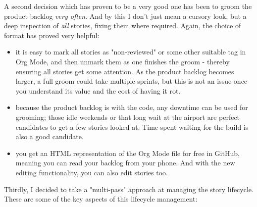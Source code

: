 \documentclass{book}
\begin{document}
A second decision which has proven to be a very good one has been to
groom the product backlog \emph{very often}. And by this I don't just mean
a cursory look, but a deep inspection of \emph{all} stories, fixing them
where required. Again, the choice of format has proved very helpful:

\begin{itemize}
\item it is easy to mark all stories as "non-reviewed" or some other
suitable tag in Org Mode, and then unmark them as one finishes the
groom - thereby ensuring all stories get some attention. As the
product backlog becomes larger, a full groom could take multiple
sprints, but this is not an issue once you understand its value and
the cost of having it rot.
\item because the product backlog is with the code, any downtime can be
used for grooming; those idle weekends or that long wait at the
airport are perfect candidates to get a few stories looked at. Time
spent waiting for the build is also a good candidate.
\item you get an HTML representation of the Org Mode file for free in
GitHub, meaning you can read your backlog from your phone. And with
the new editing functionality, you can also edit stories too.
\end{itemize}

Thirdly, I decided to take a "multi-pass" approach at managing the
story lifecycle. These are some of the key aspects of this lifecycle
management:
\end{document}
